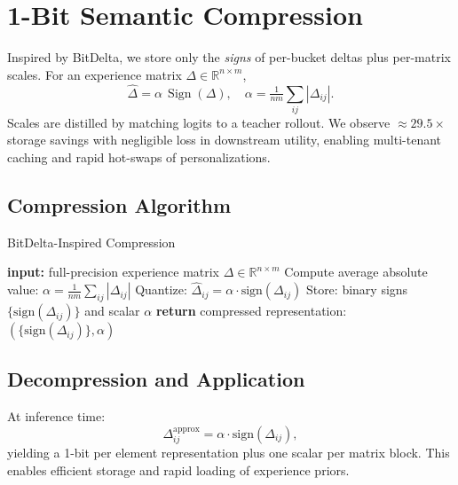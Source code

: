 \section{1-Bit Semantic Compression}\label{sec:bitdelta}
Inspired by BitDelta, we store only the \emph{signs} of per-bucket deltas plus per-matrix scales. For an experience matrix \(\Delta \in \mathbb R^{n\times m}\),
\begin{equation}
 \widehat{\Delta} = \alpha\,\operatorname{Sign}(\Delta),\quad \alpha = \tfrac{1}{nm}\sum\limits_{ij} |\Delta_{ij}|.
\end{equation}
Scales are distilled by matching logits to a teacher rollout. We observe \(\approx 29.5\times\) storage savings with negligible loss in downstream utility, enabling multi-tenant caching and rapid hot-swaps of personalizations.

\subsection{Compression Algorithm}
\begin{algorithm}[H]
\caption{BitDelta-Inspired Compression}
\begin{algorithmic}[1]
\State \textbf{input:} full-precision experience matrix \(\Delta \in \mathbb{R}^{n \times m}\)
\State Compute average absolute value: \(\alpha = \frac{1}{nm} \sum_{ij} |\Delta_{ij}|\)
\State Quantize: \(\widehat{\Delta}_{ij} = \alpha \cdot \text{sign}(\Delta_{ij})\)
\State Store: binary signs \(\{\text{sign}(\Delta_{ij})\}\) and scalar \(\alpha\)
\State \textbf{return} compressed representation: \((\{\text{sign}(\Delta_{ij})\}, \alpha)\)
\end{algorithmic}
\end{algorithm}

\subsection{Decompression and Application}
At inference time:
\begin{equation}
\Delta_{ij}^{\text{approx}} = \alpha \cdot \text{sign}(\Delta_{ij}),
\end{equation}
yielding a 1-bit per element representation plus one scalar per matrix block. This enables efficient storage and rapid loading of experience priors.
